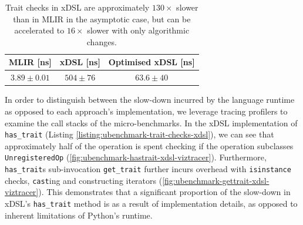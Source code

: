 \begin{table}[H]
  \caption{Trait checks in xDSL are approximately $130\times$ slower than in MLIR in the asymptotic case, but can be accelerated to $16\times$ slower with only algorithmic changes.} %
  \label{tab:ubenchmark-trait-checks}
  \centering
  \begin{tabular}{ccc}
    \toprule
    \textbf{MLIR [ns]} & \textbf{xDSL [ns]} & \textbf{Optimised xDSL [ns]} \\
    \midrule
    $3.89 \pm 0.01$ & $504 \pm 76$ & $63.6 \pm 40$\\
    \bottomrule
  \end{tabular}
\end{table}


In order to distinguish between the slow-down incurred by the language runtime as opposed to each approach's implementation, we leverage tracing profilers to examine the call stacks of the micro-benchmarks. In the xDSL implementation of \texttt{has_trait} (Listing \ref{listing:ubenchmark-trait-checks-xdsl}), we can see that approximately half of the operation is spent checking if the operation subclasses \texttt{UnregisteredOp} (\autoref{fig:ubenchmark-hastrait-xdsl-viztracer}).
Furthermore, \texttt{has_trait}s sub-invocation \texttt{get_trait} further incurs overhead with \texttt{isinstance} checks, \texttt{cast}ing and constructing iterators (\autoref{fig:ubenchmark-gettrait-xdsl-viztracer}).
This demonstrates that a significant proportion of the slow-down in xDSL's \texttt{has_trait} method is as a result of implementation details, as opposed to inherent limitations of Python's runtime.

